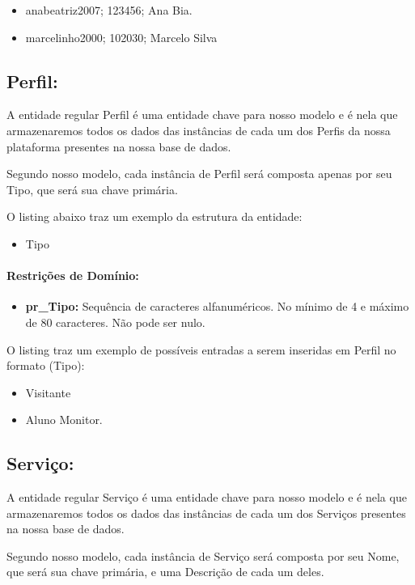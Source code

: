 \documentclass{report}
\begin{document}
\begin{itemize}
	\item anabeatriz2007; 123456; Ana Bia. 
	\item marcelinho2000; 102030; Marcelo Silva
\end{itemize}
\subsection{Perfil:}
  A entidade regular Perfil é uma entidade chave para nosso modelo e é nela que armazenaremos todos os dados das instâncias de cada um dos Perfis da nossa plataforma presentes na nossa base de dados.
	
	Segundo nosso modelo, cada instância de Perfil será composta apenas por seu Tipo, que será sua chave primária.
		
	O listing abaixo traz um exemplo da estrutura da entidade:
\begin{itemize}
  \item Tipo
\end{itemize}
\paragraph{Restrições de Domínio:}
\begin{itemize}
  \item \textbf{pr\_Tipo:} Sequência de caracteres alfanuméricos. No mínimo de 4 e máximo de 80 caracteres. Não pode ser nulo.
\end{itemize}
O listing traz um exemplo de possíveis entradas a serem inseridas em Perfil no formato (Tipo):

\begin{itemize}
	\item Visitante
	\item Aluno Monitor.
\end{itemize}
\subsection{Serviço:}
  A entidade regular Serviço é uma entidade chave para nosso modelo e é nela que armazenaremos todos os dados das instâncias de cada um dos Serviços presentes na nossa base de dados.
	
	Segundo nosso modelo, cada instância de Serviço será composta por seu Nome, que será sua chave primária, e uma Descrição de cada um deles. 
		
\end{document}
